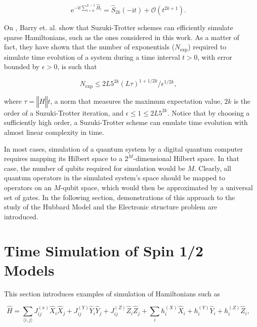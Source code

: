     \begin{equation}
      \mathrm{e}^{-\mathrm{i}t \sum_{l = 0}^{L-1} \hat{H}_l} = \hat{S}_{2k}(-\mathrm{i}t) + \mathcal{O}(t^{2k+1}).
    \end{equation}

    On \cite{BerryErrorBounds}, Barry et. al. show that Suzuki-Trotter schemes can efficiently simulate sparse Hamiltonians, such as the ones considered in this work. As a matter of fact, they have shown that the number of exponentials ($N_{\text{exp}}$) required to simulate time evolution of a system during a time interval $t > 0$, with error bounded by $\epsilon > 0$, is such that

    \begin{equation}
      N_{\text{exp}} \leq 2L5^{2k}(L\tau)^{1+1/2k}/\epsilon^{1/2k},
    \end{equation}

    \noindent where $\tau = \left\Vert \hat{H} \right\Vert t$, a norm that measures the maximum expectation value, $2k$ is the order of a Suzuki-Trotter iteration, and $\epsilon \leq 1 \leq 2L5^{2k}$. Notice that by choosing a sufficiently high order, a Suzuki-Trotter scheme can emulate time evolution with almost linear complexity in time.

    In most cases, simulation of a quantum system by a digital quantum computer requires mapping its Hilbert space to a $2^M$-dimensional Hilbert space. In that case, the number of qubits required for simulation would be $M$. Clearly, all quantum operators in the simulated system's space should be mapped to operators on an $M$-qubit space, which would then be approximated by a universal set of gates. In the following section, demonstrations of this approach to the study of the Hubbard Model and the Electronic structure problem are introduced.

\section{Time Simulation of Spin 1/2 Models}
\label{sec:hubbard}
  
  This section introduces examples of simulation of Hamiltonians such as

  \begin{equation}
    \hat{H} = \sum_{\langle i,j \rangle} J_{ij}^{(x)} \hat{X}_i \hat{X}_j + J_{ij}^{(Y)} \hat{Y}_i \hat{Y}_j + J_{ij}^{(Z)} \hat{Z}_i \hat{Z}_j + \sum_i h_i^{(X)} \hat{X}_i + h_i^{(Y)} \hat{Y}_i + h_i^{(Z)} \hat{Z}_i,
    \label{eq:HeisenbergHamiltonian}
  \end{equation}

